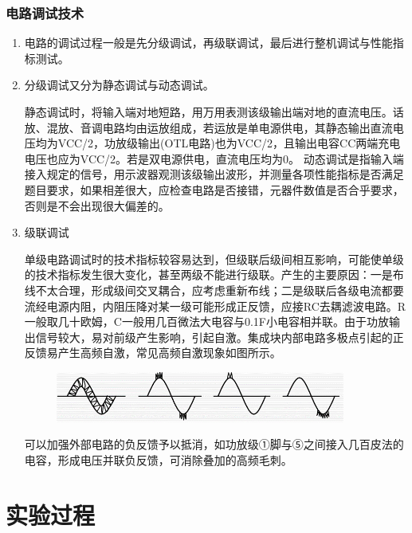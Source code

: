 \documentclass[a4paper,11pt,UTF8]{article}
\numberwithin{equation}{subsection}
\begin{document}
\subsubsection{电路调试技术}
\begin{enumerate}
	\setlength{\itemsep}{0pt}
	\item 电路的调试过程一般是先分级调试，再级联调试，最后进行整机调试与性能指标测试。
	\item 分级调试又分为静态调试与动态调试。
	
	静态调试时，将输入端对地短路，用万用表测该级输出端对地的直流电压。话放、混放、音调电路均由运放组成，若运放是单电源供电，其静态输出直流电压均为\newline VCC/2，功放级输出(OTL电路)也为VCC/2，且输出电容CC两端充电电压也应为\newline VCC/2。若是双电源供电，直流电压均为0。
	动态调试是指输入端接入规定的信号，用示波器观测该级输出波形，并测量各项性能指标是否满足题目要求，如果相差很大，应检查电路是否接错，元器件数值是否合乎要求，否则是不会出现很大偏差的。
	\item 级联调试
	
	单级电路调试时的技术指标较容易达到，但级联后级间相互影响，可能使单级的技术指标发生很大变化，甚至两级不能进行级联。产生的主要原因：一是布线不太合理，形成级间交叉耦合，应考虑重新布线；二是级联后各级电流都要流经电源内阻，内阻压降对某一级可能形成正反馈，应接RC去耦滤波电路。R一般取几十欧姆，C一般用几百微法大电容与0.1F小电容相并联。由于功放输出信号较大，易对前级产生影响，引起自激。集成块内部电路多极点引起的正反馈易产生高频自激，常见高频自激现象如图所示。
	\begin{figure}[H]
		\centering
		\includegraphics[width=0.9\textwidth]{2}
	\end{figure}
	可以加强外部电路的负反馈予以抵消，如功放级①脚与⑤之间接入几百皮法的电容，形成电压并联负反馈，可消除叠加的高频毛刺。
	
\end{enumerate}
\section{实验过程}
\end{document}
